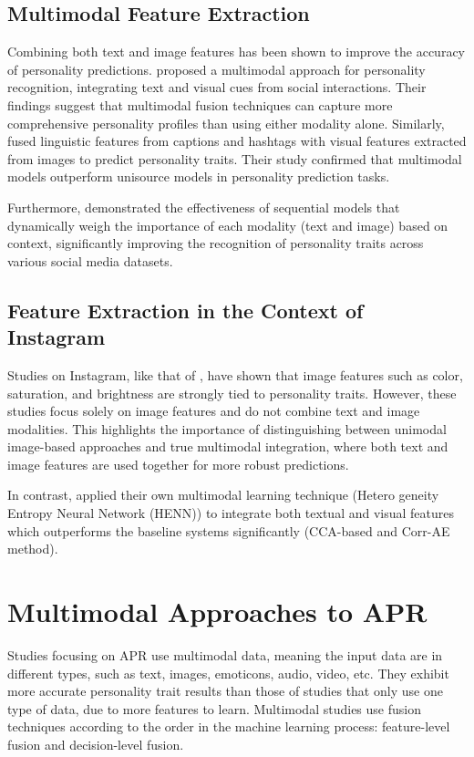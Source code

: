 \subsection{Multimodal Feature Extraction}

Combining both text and image features has been shown to improve the accuracy of personality predictions. \citet{Batrinca2016} proposed a multimodal approach for personality recognition, integrating text and visual cues from social interactions. Their findings suggest that multimodal fusion techniques can capture more comprehensive personality profiles than using either modality alone. Similarly, \citet{Skowron2016} fused linguistic features from captions and hashtags with visual features extracted from images to predict personality traits. Their study confirmed that multimodal models outperform unisource models in personality prediction tasks.

Furthermore, \citet{Lima2022b} demonstrated the effectiveness of sequential models that dynamically weigh the importance of each modality (text and image) based on context, significantly improving the recognition of personality traits across various social media datasets.

\subsection{Feature Extraction in the Context of Instagram}

Studies on Instagram, like that of \citet{Ferwerda2016}, have shown that image features such as color, saturation, and brightness are strongly tied to personality traits. However, these studies focus solely on image features and do not combine text and image modalities. This highlights the importance of distinguishing between unimodal image-based approaches and true multimodal integration, where both text and image features are used together for more robust predictions.

In contrast, \citet{Xianyu2016} applied their own multimodal learning technique (Hetero
geneity Entropy Neural Network (HENN)) to integrate both textual and visual features which outperforms the baseline systems significantly (CCA-based and Corr-AE method).

\section{Multimodal Approaches to APR}
\label{sec: MMApproaches}
Studies focusing on APR use multimodal data, meaning the input data are in different types, such as text, images, emoticons, audio, video, etc. They exhibit more accurate personality trait results than those of studies that only use one type of data, due to more features to learn. Multimodal studies use fusion techniques according to the order in the machine learning process: feature-level fusion and decision-level fusion.

